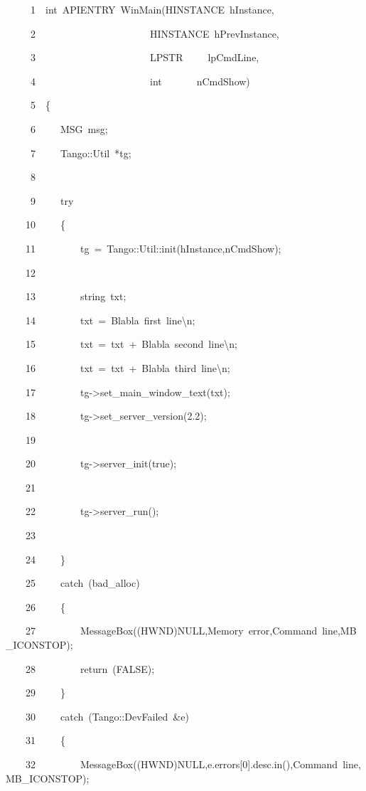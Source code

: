 
\begin{lyxcode}
~~~~~1~~int~APIENTRY~WinMain(HINSTANCE~hInstance,

~~~~~2~~~~~~~~~~~~~~~~~~~~~~~HINSTANCE~hPrevInstance,

~~~~~3~~~~~~~~~~~~~~~~~~~~~~~LPSTR~~~~~lpCmdLine,

~~~~~4~~~~~~~~~~~~~~~~~~~~~~~int~~~~~~~nCmdShow)

~~~~~5~~\{

~~~~~6~~~~~MSG~msg;

~~~~~7~~~~~Tango::Util~{*}tg;

~~~~~8~~

~~~~~9~~~~~try

~~~~10~~~~~\{

~~~~11~~~~~~~~~tg~=~Tango::Util::init(hInstance,nCmdShow);

~~~~12~~

~~~~13~~~~~~~~~string~txt;

~~~~14~~~~~~~~~txt~=~\textquotedbl{}Blabla~first~line\textbackslash{}n\textquotedbl{};

~~~~15~~~~~~~~~txt~=~txt~+~\textquotedbl{}Blabla~second~line\textbackslash{}n\textquotedbl{};

~~~~16~~~~~~~~~txt~=~txt~+~\textquotedbl{}Blabla~third~line\textbackslash{}n\textquotedbl{};

~~~~17~~~~~~~~~tg->set\_main\_window\_text(txt);

~~~~18~~~~~~~~~tg->set\_server\_version(\textquotedbl{}2.2\textquotedbl{});

~~~~19~~

~~~~20~~~~~~~~~tg->server\_init(true);

~~~~21~~

~~~~22~~~~~~~~~tg->server\_run();

~~~~23~~

~~~~24~~~~~\}

~~~~25~~~~~catch~(bad\_alloc)

~~~~26~~~~~\{

~~~~27~~~~~~~~~MessageBox((HWND)NULL,\textquotedbl{}Memory~error\textquotedbl{},\textquotedbl{}Command~line\textquotedbl{},MB\_ICONSTOP);

~~~~28~~~~~~~~~return~(FALSE);

~~~~29~~~~~\}

~~~~30~~~~~catch~(Tango::DevFailed~\&e)

~~~~31~~~~~\{

~~~~32~~~~~~~~~MessageBox((HWND)NULL,e.errors{[}0{]}.desc.in(),\textquotedbl{}Command~line\textquotedbl{},MB\_ICONSTOP);


\end{lyxcode}
